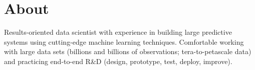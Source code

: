 \documentclass[print]{friggeri-cv} %
\begin{document}
\section{About}
Results-oriented data scientist with experience in building large predictive
systems using cutting-edge machine learning techniques. Comfortable working
with large data sets (billions and billions of observations; tera-to-petascale
data) and practicing end-to-end R\&D (design, prototype, test, deploy,
improve).

\iftoggle{cv}
{\section{Research/Work Experience}
}
{\section{Selected Experience}
}
\end{document}
